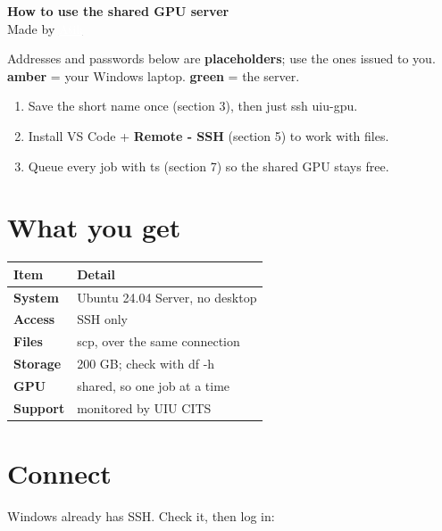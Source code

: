 \documentclass[12pt,a4paper]{article}
\newcommand{\cmd}[1]{{\ttfamily\small #1}}
\begin{document}
\begin{titleband}
{\LARGE\bfseries\color{white} How to use the shared GPU server}\\[5pt]
{\small\color{white} Made by \href{https://www.atikurrahaman.site}{\textcolor{white}{\underline{Atik}}}}
\end{titleband}

\begin{legend}
Addresses and passwords below are \textbf{placeholders}; use the ones issued to you.
\quad\textcolor{amber}{\textbf{amber}} = your Windows laptop.\quad
\textcolor{forest}{\textbf{green}} = the server.
\end{legend}

\begin{quick}
\begin{enumerate}[leftmargin=1.2em,itemsep=1pt,topsep=0pt]
  \item Save the short name once (section 3), then just \cmd{ssh uiu-gpu}.
  \item Install VS Code + \textbf{Remote - SSH} (section 5) to work with files.
  \item Queue every job with \cmd{ts} (section 7) so the shared GPU stays free.
\end{enumerate}
\end{quick}

\section{What you get}

\begin{tabularx}{\linewidth}{@{}>{\bfseries}lX@{}}
\toprule
\rowcolor{forest!16} Item & Detail \\
\midrule
System & Ubuntu 24.04 Server, no desktop \\
Access & SSH only \\
Files & \cmd{scp}, over the same connection \\
Storage & 200 GB; check with \cmd{df -h} \\
GPU & shared, so one job at a time \\
Support & monitored by UIU CITS \\
\bottomrule
\end{tabularx}

\section{Connect}

Windows already has SSH. Check it, then log in:
\end{document}
